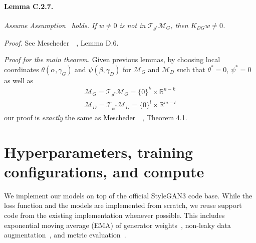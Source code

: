\paragraph{Lemma C.2.7.} \emph{Assume Assumption~ holds. If $w\neq0$ is not in $\mathcal{T}_{\theta^*}\mathcal{M}_G$, then $K_{DG}w\neq0$.}

\emph{Proof.} See Mescheder~\etal~\cite{r1}, Lemma D.6.

\emph{Proof for the main theorem.} Given previous lemmas, by choosing local coordinates $\theta(\alpha,\gamma_G)$ and $\psi(\beta,\gamma_D)$ for $\mathcal{M}_G$ and $\mathcal{M}_D$ such that $\theta^*=0$, $\psi^*=0$ as well as
\begin{align}
\mathcal{M}_G=\mathcal{T}_{\theta^*}\mathcal{M}_G=\{0\}^k\times\mathbb{R}^{n-k} \\
\mathcal{M}_D=\mathcal{T}_{\psi^*}\mathcal{M}_D=\{0\}^l\times\mathbb{R}^{m-l}
\end{align}
our proof is \emph{exactly} the same as Mescheder~\etal~\cite{r1}, Theorem 4.1.

\newpage
\section{Hyperparameters, training configurations, and compute}
We implement our models on top of the official StyleGAN3 code base. While the loss function and the models are implemented from scratch, we reuse support code from the existing implementation whenever possible. This includes exponential moving average (EMA) of generator weights~\cite{pggan}, non-leaky data augmentation~\cite{sg2ada}, and metric evaluation~\cite{sg3}.

\vspace{-0.1cm}
